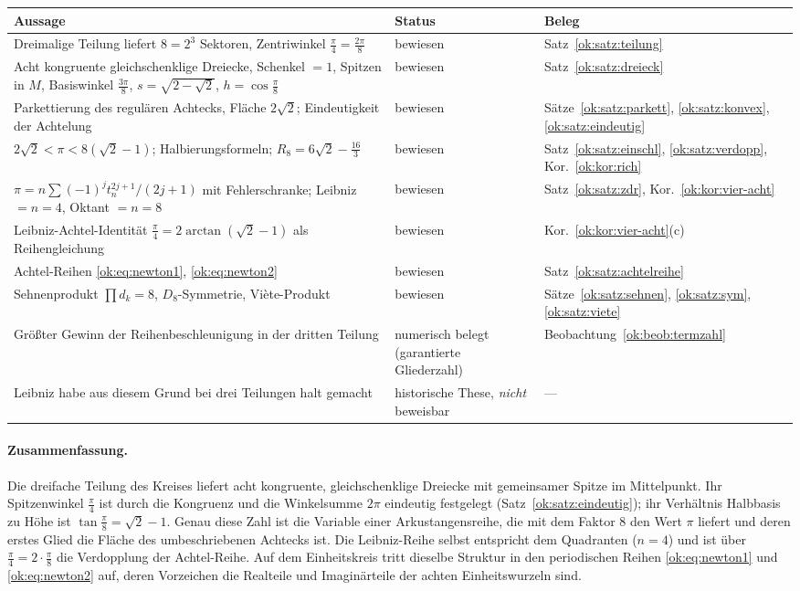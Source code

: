 \documentclass[a4paper,12pt,twoside]{report}
\theoremstyle{definition}
\begin{document}
\begin{center}
\small
\begin{tabular}{p{} p{} p{}}
\textbf{Aussage} & \textbf{Status} & \textbf{Beleg}\\\hline
Dreimalige Teilung liefert $8=2^3$ Sektoren, Zentriwinkel $\frac\pi4=\frac{2\pi}8$ & bewiesen & Satz~\ref{ok:satz:teilung}\\
Acht kongruente gleichschenklige Dreiecke, Schenkel $=1$, Spitzen in $M$, Basiswinkel $\frac{3\pi}8$, $s=\sqrt{2-\sqrt2}$, $h=\cos\frac\pi8$ & bewiesen & Satz~\ref{ok:satz:dreieck}\\
Parkettierung des regulären Achtecks, Fläche $2\sqrt2$; Eindeutigkeit der Achtelung & bewiesen & Sätze~\ref{ok:satz:parkett}, \ref{ok:satz:konvex}, \ref{ok:satz:eindeutig}\\
$2\sqrt2<\pi<8(\sqrt2-1)$; Halbierungsformeln; $R_8=6\sqrt2-\frac{16}3$ & bewiesen & Satz~\ref{ok:satz:einschl}, \ref{ok:satz:verdopp}, Kor.~\ref{ok:kor:rich}\\
$\pi=n\sum(-1)^jt_n^{2j+1}/(2j+1)$ mit Fehlerschranke; Leibniz $=n{=}4$, Oktant $=n{=}8$ & bewiesen & Satz~\ref{ok:satz:zdr}, Kor.~\ref{ok:kor:vier-acht}\\
Leibniz-Achtel-Identität $\frac\pi4=2\arctan(\sqrt2-1)$ als Reihengleichung & bewiesen & Kor.~\ref{ok:kor:vier-acht}(c)\\
Achtel-Reihen \eqref{ok:eq:newton1}, \eqref{ok:eq:newton2} & bewiesen & Satz~\ref{ok:satz:achtelreihe}\\
Sehnenprodukt $\prod d_k=8$, $D_8$-Symmetrie, Viète-Produkt & bewiesen & Sätze~\ref{ok:satz:sehnen}, \ref{ok:satz:sym}, \ref{ok:satz:viete}\\
Größter Gewinn der Reihenbeschleunigung in der dritten Teilung & numerisch belegt (garantierte Gliederzahl) & Beobachtung~\ref{ok:beob:termzahl}\\
Leibniz habe aus diesem Grund bei drei Teilungen halt gemacht & historische These, \emph{nicht} beweisbar & ---
\end{tabular}
\end{center}

\paragraph{Zusammenfassung.}
Die dreifache Teilung des Kreises liefert acht kongruente, gleichschenklige Dreiecke mit gemeinsamer Spitze im Mittelpunkt. Ihr Spitzenwinkel $\frac\pi4$ ist durch die Kongruenz und die Winkelsumme $2\pi$ eindeutig festgelegt (Satz~\ref{ok:satz:eindeutig}); ihr Verhältnis Halbbasis zu Höhe ist $\tan\frac\pi8=\sqrt2-1$. Genau diese Zahl ist die Variable einer Arkustangensreihe, die mit dem Faktor $8$ den Wert $\pi$ liefert und deren erstes Glied die Fläche des umbeschriebenen Achtecks ist. Die Leibniz-Reihe selbst entspricht dem Quadranten ($n=4$) und ist über $\frac\pi4=2\cdot\frac\pi8$ die Verdopplung der Achtel-Reihe. Auf dem Einheitskreis tritt dieselbe Struktur in den periodischen Reihen \eqref{ok:eq:newton1} und \eqref{ok:eq:newton2} auf, deren Vorzeichen die Realteile und Imaginärteile der achten Einheitswurzeln sind.
\end{document}
